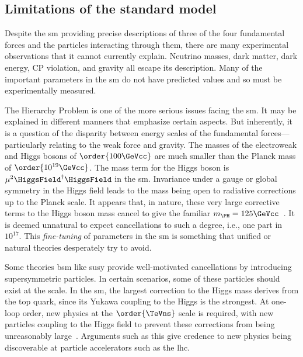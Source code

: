 

\subsection{Limitations of the standard model}
\label{subsec:sm_limitations}


Despite the \acrlong{sm} providing precise descriptions of three of the four fundamental forces and the particles interacting through them, there are many experimental observations that it cannot currently explain. Neutrino masses, dark matter, dark energy, CP violation, and gravity all escape its description. Many of the important parameters in the \acrshort{sm} do not have predicted values and so must be experimentally measured.

The Hierarchy Problem is one of the more serious issues facing the \acrlong{sm}. It may be explained in different manners that emphasize certain aspects. But inherently, it is a question of the disparity between energy scales of the fundamental forces---particularly relating to the weak force and gravity. The masses of the electroweak and Higgs bosons of $\order{\text{100}\GeVcc}$ are much smaller than the Planck mass of $\order{\text{10}^{19}\GeVcc}$. The mass term for the Higgs boson is $\mu^2 \HiggsField^{\dagger} \HiggsField$ in the \acrshort{sm}. Invariance under a gauge or global symmetry in the Higgs field leads to the mass being open to radiative corrections up to the Planck scale. It appears that, in nature, these very large corrective terms to the Higgs boson mass cancel to give the familiar $m_{\PH} = \text{125}\GeVcc$~\cite{Chatrchyan:2012xdj,Aad:2012tfa}. It is deemed unnatural to expect cancellations to such a degree, i.e., one part in $\text{10}^{17}$. This \emph{fine-tuning} of parameters in the \acrlong{sm} is something that unified or natural theories desperately try to avoid.

Some theories \acrfull{bsm} like \acrfull{susy} provide well-motivated cancellations by introducing supersymmetric particles. In certain scenarios, some of these particles should exist at the \TeVns scale. In the \acrshort{sm}, the largest correction to the Higgs mass derives from the top quark, since its Yukawa coupling to the Higgs is the strongest. At one-loop order, new physics at the $\order{\TeVns}$ scale is required, with new particles coupling to the Higgs field to prevent these corrections from being unreasonably large~\cite{Farina:2013ssa}. Arguments such as this give credence to new physics being discoverable at particle accelerators such as the \acrlong{lhc}.


